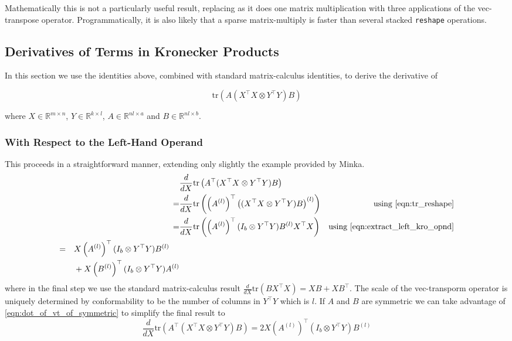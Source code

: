 \documentclass[10pt,fleqn]{article}
\newcommand \tr { \text{tr} }
\newcommand \T { ^\top }
\newcommand \Tr[1]   { \tr \left(  {#1}  \right) }
\newcommand \MReal[2] { { \mathbb{R}^{#1 \times #2} } }
\newcommand \vt[2] { { #1^{(#2)} } }
\begin{document}
\begin{appendices}
Mathematically this is not a particularly useful result, replacing as it does one matrix multiplication with three applications of the vec-transpose operator. Programmatically, it is also likely that a sparse matrix-multiply is faster than several stacked \texttt{reshape} operations.

\subsection{Derivatives of Terms in Kronecker Products}
In this section we use the identities above, combined with standard matrix-calculus identities, to derive the derivative of

\begin{equation}
\Tr{A (X\T X \otimes Y\T Y) B}
\end{equation}

where $X \in \MReal{m}{n}$, $Y \in \MReal{k}{l}$, $A \in \MReal{nl}{a}$ and $B \in \MReal{nl}{b}$.

\subsubsection{With Respect to the Left-Hand Operand}
\newcommand \ddX  { \frac{d}{dX} }

This proceeds in a straightforward manner, extending only slightly the example provided by Minka. 
\begin{align}
  & \ddX \Tr{A\T (X\T X \otimes Y\T Y) B} \\
= & \ddX \Tr{\left(\vt{A}{l}\right)\T \vt{\left( (X\T X \otimes Y\T Y) B \right)}{l}} & \text{using } \eqref{eqn:tr_reshape} \\
= & \ddX \Tr{\left(\vt{A}{l}\right)\T (I_{b} \otimes Y\T Y) \vt{B}{l} X\T X} & \text{using } \eqref{eqn:extract_left_kro_opnd} \\
\begin{split}
= & \quad X \left(\vt{A}{l}\right)\T (I_{b} \otimes Y\T Y) \vt{B}{l} \\
  & \quad + X \left(\vt{B}{l}\right)\T (I_{b} \otimes Y\T Y) \vt{A}{l}  \label{eqn:lhs_kro_derivative}
\end{split}
\end{align}
where in the final step we use the standard matrix-calculus result $\ddX \Tr{B X \T X} = XB + XB\T$. The scale of the vec-transporm operator is uniquely determined by conformability to be the number of columns in $Y\T Y$ which is $l$. If $A$ and $B$ are symmetric we can take advantage of \eqref{eqn:dot_of_vt_of_symmetric} to simplify the final result to
\begin{equation}
\ddX \Tr{A\T (X\T X \otimes Y\T Y) B} = 2X \left(\vt{A}{l}\right)\T (I_{b} \otimes Y\T Y) \vt{B}{l} \label{eqn:lhs_kro_derivative_symm_final}
\end{equation}



\end{appendices}
\end{document}
